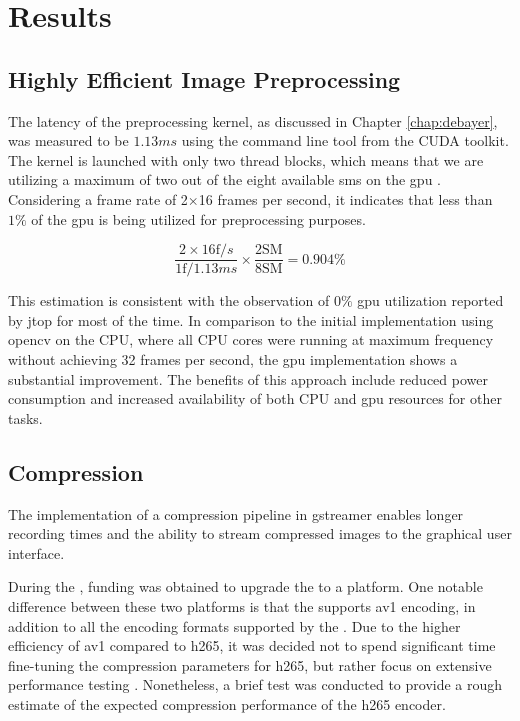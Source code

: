 \chapter{Results}
\label{chap:results}

\section{Highly Efficient Image Preprocessing}
The latency of the preprocessing kernel, as discussed in Chapter \ref{chap:debayer}, was measured to be $1.13ms$ using the  command line tool from the CUDA toolkit. The kernel is launched with only two thread blocks, which means that we are utilizing a maximum of two out of the eight available \glspl{sm} on the \gls{gpu} \cite{rigerunNVIDIAJetsonXavier2023}. Considering a frame rate of 2$\times$16 frames per second, it indicates that less than $1\%$ of the \gls{gpu} is being utilized for preprocessing purposes.

\begin{equation}
    \frac{2 \times 16 \text{f}/s}{1 \text{f} / 1.13ms} \times \frac{2 \text{SM}}{8 \text{SM}} = 0.904\%
\end{equation}


This estimation is consistent with the observation of $0\%$ \gls{gpu} utilization reported by \gls{jtop} for most of the time. In comparison to the initial implementation using \gls{opencv} on the CPU, where all CPU cores were running at maximum frequency without achieving 32 frames per second, the \gls{gpu} implementation shows a substantial improvement. The benefits of this approach include reduced power consumption and increased availability of both CPU and \gls{gpu} resources for other tasks.

\section{Compression}
The implementation of a compression pipeline in \gls{gstreamer} enables longer recording times and the ability to stream compressed images to the graphical user interface.

During the \master, funding was obtained to upgrade the \jx to a \jo platform.
One notable difference between these two platforms is that the \jo supports \gls{av1} encoding, in addition to all the encoding formats supported by the \jx \cite{karumbunathanNVIDIAJetsonAGX2022}.
Due to the higher efficiency of \gls{av1} compared to \gls{h265}, it was decided not to spend significant time fine-tuning the compression parameters for \gls{h265}, but rather focus on extensive performance testing \cite{torresAV1VsHEVC2022}.
Nonetheless, a brief test was conducted to provide a rough estimate of the expected compression performance of the \gls{h265} encoder.


